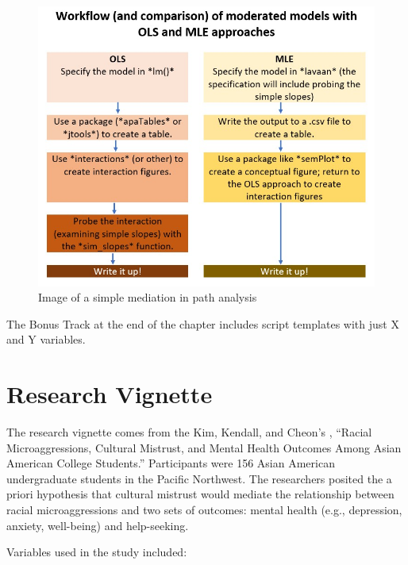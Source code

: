 \documentclass[
]{book}
\begin{document}
\begin{figure}
\centering
\includegraphics{images/SimpleMod/OLS_MLEwrkflow.jpg}
\caption{Image of a simple mediation in path analysis}
\end{figure}

The Bonus Track at the end of the chapter includes script templates with just X and Y variables.

\hypertarget{research-vignette-6}{%
\section{Research Vignette}\label{research-vignette-6}}

The research vignette comes from the Kim, Kendall, and Cheon's \citeyearpar{kim_racial_2017}, ``Racial Microaggressions, Cultural Mistrust, and Mental Health Outcomes Among Asian American College Students.'' Participants were 156 Asian American undergraduate students in the Pacific Northwest. The researchers posited the a priori hypothesis that cultural mistrust would mediate the relationship between racial microaggressions and two sets of outcomes: mental health (e.g., depression, anxiety, well-being) and help-seeking.

Variables used in the study included:
\end{document}
